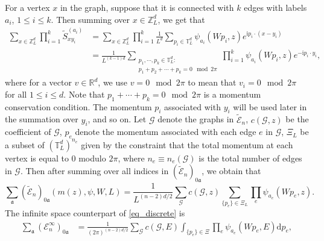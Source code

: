 \documentclass{article}
\newcommand{\1}{\mathds{1}}
\numberwithin{equation}{section}
\newcommand{\be}{\begin{equation}}
\newcommand{\ee}{\end{equation}}
\newcommand{\fa}{{\mathfrak a}}
\renewcommand{\cal}{\mathcal}
\newcommand{\wt}{\widetilde}
\newcommand{\ii}{\mathrm{i}} %
\newcommand{\dd}{\mathrm{d}}
\renewcommand{\leq}{\leqslant}
\renewcommand{\le}{\leq}
\newcommand{\R}{\mathbb{R}}
\newcommand{\Z}{\mathbb{Z}}
\theoremstyle{plain} %
\theoremstyle{remark}
\newcommand{\Sele}{{\mathcal E}}
\newcommand{\Seleinf}{{\mathcal E}^{\infty}}
\begin{document}
	
For a vertex $x$ in the graph, suppose that it is connected with $k$ edges with labels $a_i$, $1\le i \le k$. Then summing over $x\in \Z_L^d$, we get that
\begin{align*}
\sum_ {x\in \Z_L^d} \prod_{i=1}^k \wt S^{(a_i)} _{xy_i} & =\sum_{x\in \Z_L^d} \prod_{i=1}^k \frac{1}{L^d}\sum_{p_i\in \mathbb T_L^d}\psi_{a_i} (Wp_i,z)e^{\ii p_i \cdot (x-y_i)}  \\
& = \frac{1}{L^{(k-1)d}}\sum_{\substack{p_1,\cdots, p_k\in \mathbb T_L^d: \\ p_1+p_2+\cdots+p_k=0 \mod 2\pi}}\prod_{i=1}^k\psi_{a_i}(Wp_i,z)e^{-\ii p_i \cdot y_i}  ,
\end{align*}
where for a vector $v\in \R^d$, we use $v=0 \mod 2\pi$ to mean that $v_i=0 \mod 2\pi$ for all $1\le i \le d$. Note that $p_1+\cdots+p_k=0 \mod 2\pi$ is a momentum conservation condition. The momentum $p_i$ associated with $y_i$ will be used later in the summation over $y_i$, and so on. Let $\cal G$ denote the graphs in $\wt\Sele_{n}$, $c(\cal G, z)$ be the coefficient of $\cal G$, $p_e$ denote the momentum associated with each edge $e$ in $\cal G$, $\Xi_L$ be a subset of $(\mathbb T_L^{d})^{n_e}$ given by the constraint that the total momentum at each vertex is equal to 0 modulo $2\pi$, where $n_e\equiv n_e(\cal G)$ is the total number of edges in $\cal G$.  Then after summing over all indices in $(\wt\Sele_{n})_{0\fa}$, we obtain that %
\be\label{eq_discrete} 
\sum_{\fa} (\wt\Sele_{n})_{0\fa }(m(z),\psi,W,L)=\frac{1}{L^{(n-2) d/2 }}\sum_{\cal G}c(\cal G, z)\sum_{ \{p_e\} \in \Xi_{L}}\prod_{e}\psi_{a_e}(Wp_e,z) . 
\ee
The infinite space counterpart of \eqref{eq_discrete} is
\begin{align}\label{eq_discrete2} \sum_{\fa} (\Seleinf_{n})_{0\fa }&=\frac{1}{(2\pi)^{(n-2) d/2}}\sum_{\cal G}c(\cal G, E)\int_{ \{p_e\} \in \Xi}\prod_{e}\psi_{a_e}(Wp_e, E) \dd p_e ,
\end{align}
\end{document}
